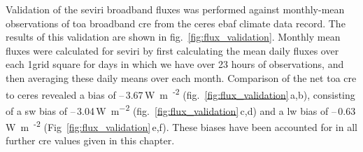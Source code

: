 Validation of the \acrshort{seviri} broadband fluxes was performed against monthly-mean observations of \acrshort{toa} broadband \acrshort{cre} from the \acrfull{ceres} \citep{loeb_clouds_2018} \acrfull{ebaf} climate data record. 
The results of this validation are shown in fig.~\ref{fig:flux_validation}. 
Monthly mean fluxes were calculated for \acrshort{seviri} by first calculating the mean daily fluxes over each 1\textdegree grid square for days in which we have over 23 hours of observations, and then averaging these daily means over each month. 
Comparison of the net \acrshort{toa} \acrshort{cre} to \acrshort{ceres} revealed a bias of --\,3.67\,\unit{W m\textsuperscript{-2}} (fig.~\ref{fig:flux_validation}\,a,b), consisting of a \acrshort{sw} bias of --\,3.04\,\unit{W m^{-2}} (fig.~\ref{fig:flux_validation}\,c,d) and a \acrshort{lw} bias of --\,0.63\,\unit{W m\textsuperscript{-2}} (Fig~\ref{fig:flux_validation}\,e,f). 
These biases have been accounted for in all further \acrshort{cre} values given in this chapter.


